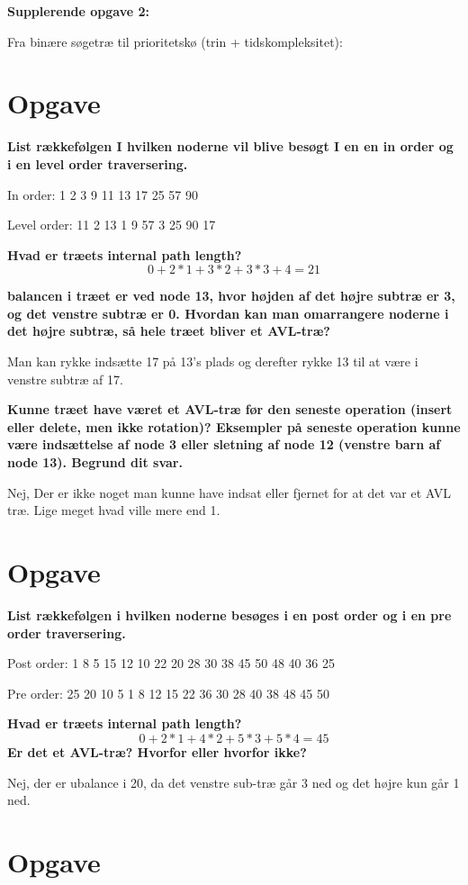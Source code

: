 \documentclass{article}
\begin{document}
\textbf{Supplerende opgave 2:}

Fra binære søgetræ til prioritetskø (trin + tidskompleksitet):


\section{Opgave} %
\textbf{List rækkefølgen I hvilken noderne vil blive besøgt I en en in order og i en level order traversering.}

In order: 1 2 3 9 11 13 17 25 57 90

Level order: 11 2 13 1 9 57 3 25 90 17

\textbf{Hvad er træets internal path length?}  
$$0 + 2 * 1 + 3 * 2 + 3 * 3 + 4 = 21$$

\textbf{balancen i træet er ved node 13, hvor højden af det højre subtræ er 3, og det venstre subtræ er 0.
Hvordan kan man omarrangere noderne i det højre subtræ, så hele træet bliver et AVL-træ?}

Man kan rykke indsætte 17 på 13's plads og derefter rykke 13 til at være i venstre subtræ af 17.
 
\textbf{Kunne træet have været et AVL-træ før den seneste operation (insert eller delete, men ikke rotation)? 
Eksempler på seneste operation kunne være indsættelse af node 3 eller sletning af node 12 (venstre barn af 
node 13). Begrund dit svar.}

Nej, Der er ikke noget man kunne have indsat eller fjernet for at det var et AVL træ. Lige meget hvad ville mere end 1.

\section{Opgave} %
\textbf{List rækkefølgen i hvilken noderne besøges i en post order og i en pre order traversering.}

Post order: 1 8 5 15 12 10 22 20 28 30 38 45 50 48 40 36 25

Pre order: 25 20 10 5 1 8 12 15 22 36 30 28 40 38 48 45 50

\textbf{Hvad er træets internal path length?}
$$0 + 2 * 1 + 4 * 2 + 5 * 3 + 5 * 4 = 45$$
\textbf{Er det et AVL-træ? Hvorfor eller hvorfor ikke?}

Nej, der er ubalance i 20, da det venstre sub-træ går 3 ned og det højre kun går 1 ned.

\section{Opgave} %
\end{document}
